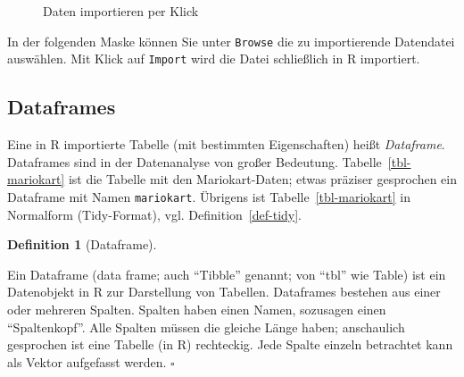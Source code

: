 \documentclass[
  letterpaper,
]{scrbook}
\theoremstyle{definition}
\theoremstyle{definition}
\newtheorem{definition}{Definition}[chapter]
\theoremstyle{definition}
\theoremstyle{remark}
\begin{document}
\begin{figure}


\caption{\label{fig-daten-rstudio}Daten importieren per Klick}

\end{figure}%

In der folgenden Maske können Sie unter \texttt{Browse} die zu
importierende Datendatei auswählen. Mit Klick auf \texttt{Import} wird
die Datei schließlich in R importiert.

\subsection{Dataframes}\label{dataframes}

Eine in R importierte Tabelle (mit bestimmten Eigenschaften) heißt
\emph{Dataframe}. Dataframes sind in der Datenanalyse von großer
Bedeutung. Tabelle~\ref{tbl-mariokart} ist die Tabelle mit den
Mariokart-Daten; etwas präziser gesprochen ein Dataframe mit Namen
\texttt{mariokart}. Übrigens ist Tabelle~\ref{tbl-mariokart} in
Normalform (Tidy-Format), vgl. Definition~\ref{def-tidy}.

\begin{definition}[Dataframe]\protect\hypertarget{def-dataframe}{}\label{def-dataframe}

Ein Dataframe (data frame; auch ``Tibble'' genannt; von ``tbl'' wie
Table) ist ein Datenobjekt in R zur Darstellung von Tabellen. Dataframes
bestehen aus einer oder mehreren Spalten. Spalten haben einen Namen,
sozusagen einen ``Spaltenkopf''. Alle Spalten müssen die gleiche Länge
haben; anschaulich gesprochen ist eine Tabelle (in R) rechteckig. Jede
Spalte einzeln betrachtet kann als Vektor aufgefasst werden. \(\square\)

\end{definition}
\end{document}
